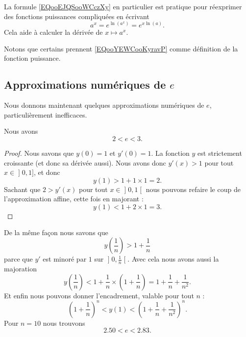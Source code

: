 La formule \eqref{EQooEJQSooWCczXy} en particulier est pratique pour réexprimer des fonctions puissances compliquées en écrivant
\begin{equation}        \label{EQooYEWCooKyravP}
    a^x= e^{\ln(a^x)}= e^{x\ln(a)}.
\end{equation}
Cela aide à calculer la dérivée de \( x\mapsto a^x\). 

Notons que certains prennent \eqref{EQooYEWCooKyravP} comme définition de la fonction puissance.

\subsection{Approximations numériques de \texorpdfstring{$ e$}{e}}

Nous donnons maintenant quelques approximations numériques de \( e\), particulièrement inefficaces.

\begin{lemma}
    Nous avons
    \begin{equation}
        2<e<3.
    \end{equation}
\end{lemma}

\begin{proof}
    Nous savons que \( y(0)=1\) et \( y'(0)=1\). La fonction \( y\) est strictement croissante (et donc sa dérivée aussi). Nous avons donc \( y'(x)>1\) pour tout \( x\in\mathopen] 0 , 1 \mathclose]\), et donc
    \begin{equation}
        y(1)>1+1\times 1=2.
    \end{equation}
    Sachant que \( 2>y'(x)\) pour tout \( x\in \mathopen] 0 , 1 \mathclose[\) nous pouvons refaire le coup de l'approximation affine, cette fois en majorant :
        \begin{equation}
            y(1)<1+2\times 1=3.
        \end{equation}
\end{proof}

De la même façon nous savons que
\begin{equation}
    y(\frac{1}{ n })>1+\frac{1}{ n }
\end{equation}
parce que \( y'\) est minoré par \( 1\) sur \( \mathopen] 0 , \frac{1}{ n } \mathclose[\). Avec cela nous avons aussi la majoration
\begin{equation}
    y(\frac{1}{ n })<1+\frac{1}{ n }\times \left( 1+\frac{1}{ n } \right)=1+\frac{1}{ n }+\frac{1}{ n^2 }.
\end{equation}
Et enfin nous pouvons donner l'encadrement, valable pour tout \( n\) :
\begin{equation}
    \left( 1+\frac{1}{ n } \right)^n<y(1)<\left( 1+\frac{1}{ n }+\frac{1}{ n^2 } \right)^n.
\end{equation}
Pour \( n=10\) nous trouvons
\begin{equation}
    2.50<e<2.83.
\end{equation}

